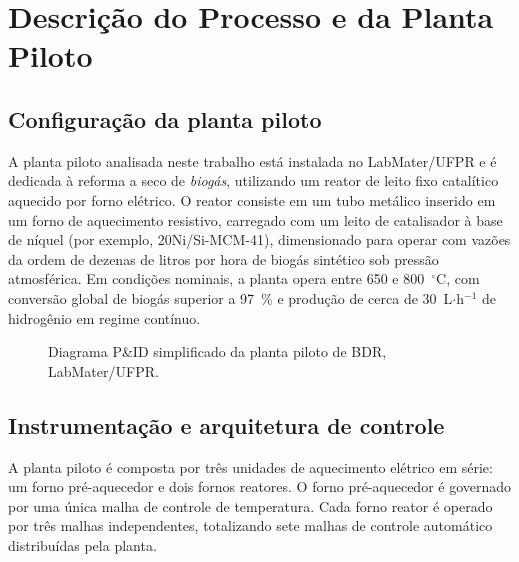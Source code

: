 
\section{Descrição do Processo e da Planta Piloto}
\label{sec:processo}

\subsection{Configuração da planta piloto}

A planta piloto analisada neste trabalho está instalada no LabMater/UFPR e é
dedicada à reforma a seco de \emph{biogás}, utilizando um reator de leito fixo
catalítico aquecido por forno elétrico.\citep{oliveira2021,labmater2024}
O reator consiste em um tubo metálico inserido em um forno de aquecimento
resistivo, carregado com um leito de catalisador à base de níquel
(por exemplo, 20Ni/Si-MCM-41), dimensionado para operar com vazões da ordem de
dezenas de litros por hora de biogás sintético sob pressão
atmosférica.\citep{oliveira2021} Em condições nominais, a planta opera entre
650 e 800~\(^\circ\)C, com conversão global de biogás superior a 97~\% e
produção de cerca de 30~L\(\cdot\)h\(^{-1}\) de hidrogênio em regime
contínuo.\citep{labmater2024}

\begin{figure}[ht]
\begin{center}
\fbox{\parbox{7.5cm}{\centering\vspace{1.2cm}
{\small [FIGURA A INSERIR]\\[4pt]
Diagrama P\&ID simplificado da planta piloto}\vspace{1.2cm}}}
\caption{Diagrama P\&ID simplificado da planta piloto de BDR, LabMater/UFPR.}
\label{fig:planta}
\end{center}
\end{figure}

\subsection{Instrumentação e arquitetura de controle}

A planta piloto é composta por três unidades de aquecimento elétrico em série:
um forno pré-aquecedor e dois fornos reatores. O forno pré-aquecedor é governado
por uma única malha de controle de temperatura. Cada forno reator é operado por
três malhas independentes, totalizando sete malhas de controle automático
distribuídas pela planta.

